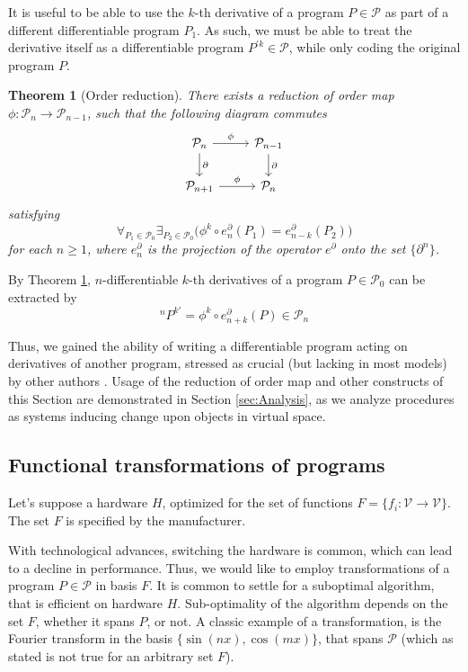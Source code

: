 \documentclass[smallcondensed]{svjour3}
\newcommand{\VV}{\mathcal{V}}
\newcommand{\dP}{\mathcal{P}}
\newcommand{\D}{\partial}
\newtheorem{izrek}{Theorem}[section]
\begin{document}
 It is useful to be able to use the $k$-th derivative of a program $P\in\dP$ as part of a different differentiable program $P_1$. As such, we must be able to treat the derivative itself as a differentiable program $P^{\prime k}\in\dP$, while only coding the original program $P$. 
\begin{izrek}[Order reduction]\label{izr:reductionMap}
There exists a reduction of order map $\phi:\dP_n\to \dP_{n-1}$, such that the
following  diagram commutes
\begin{equation}\label{eq:reductionMap}
\begin{tikzcd}
  \dP_n \arrow{r}{\phi} \arrow{d}{\D} & 
  \dP_{n-1} \arrow{d}{\D}\\
  \dP_{n+1} \arrow{r}{\phi} & 
  \dP_{n}
\end{tikzcd}
\end{equation}
satisfying
\begin{equation}
\forall_{P_1\in\dP_0}\exists_{P_2\in\dP_0}\Big(\phi^k\circ e^\D_n(P_1)=e^\D_{n-k}(P_2)\Big)
\end{equation}
for each $n\ge 1$, where $e^\D_n$ is the projection of the operator $e^\D$ onto the set $\{\D^n\}$.
\end{izrek}  
\begin{corollary}\label{cor:extraxtDerivatives}
By Theorem \ref{izr:reductionMap}, $n$-differentiable $k$-th derivatives of a program $P\in\dP_0$ can be extracted by
\begin{equation}
^{n}P^{k\prime}=\phi^k\circ e^\D_{n+k}(P)\in\dP_n
\end{equation}
\end{corollary}    
 Thus, we gained the ability of writing a differentiable program acting on derivatives of another program, stressed as crucial (but lacking in most models) by other authors \cite{AD1}. Usage of the reduction of order map and other constructs of this Section are demonstrated in Section \ref{sec:Analysis}, as we analyze procedures as systems inducing change upon objects in virtual space.
 
   \subsection{Functional transformations of programs}\label{sec:FTP}
   
   Let's suppose a hardware $H$, optimized for the set of functions
   $F=\{f_i:\VV\to \VV\}$. The set $F$ is specified by the manufacturer.  
   
   With technological advances, switching the hardware is common, which can lead
   to a decline in performance.  Thus, we would like to employ transformations
   of a program $P\in\dP$ in basis $F$. It is common to settle for a suboptimal
   algorithm, that is efficient on hardware $H$. Sub-optimality of the algorithm
   depends on the set $F$, whether it spans $P$, or not. A classic example of a
   transformation, is the Fourier transform in the basis $\{\sin(nx),
   \cos(mx)\}$, that spans $\dP$ (which as stated is not true for an arbitrary
   set $F$).
   
\end{document}
